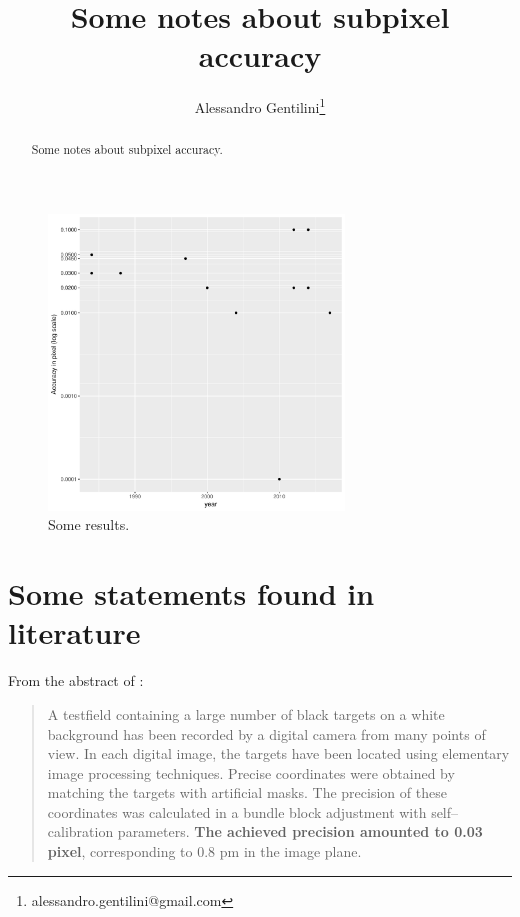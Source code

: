 \documentclass[a4paper,12pt]{article}
\title{Some notes about subpixel accuracy}
\author{Alessandro Gentilini\thanks{alessandro.gentilini@gmail.com}}
\begin{document}
\maketitle

\begin{abstract}
Some notes about subpixel accuracy.
\end{abstract} 

\begin{figure}[h]
  \centering
  \includegraphics[width=0.7\textwidth]{R_plot_1}
  \caption{Some results.}
\end{figure}

\section{Some statements found in literature}

From the abstract of \cite{vosselman1988precision}:
\begin{quotation}
A testfield containing a large number of black targets on a white background 
has been recorded by a digital camera from many points of view. 
In each digital image, the targets have been located using 
elementary image processing techniques. Precise coordinates were obtained by 
matching the targets with artificial masks. The precision of these 
coordinates was calculated in a  bundle block adjustment with self--calibration 
parameters. \textbf{The achieved precision amounted to 0.03 pixel}, 
corresponding to 0.8 pm in the image plane.
\end{quotation}
\end{document}
